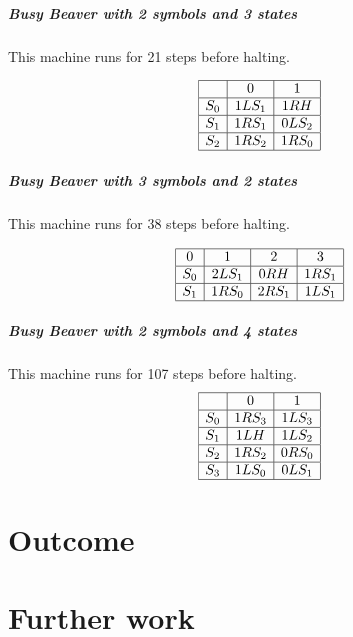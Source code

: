 \documentclass{report}
\begin{document}
\paragraph{Busy Beaver with 2 symbols and 3 states}

This machine runs for 21 steps before halting.

\[
\begin{array}[h]{|c|c|c|c|}
\hline
   & 0    &1\\
\hline
S_0& 1LS_1& 1RH\\
\hline
S_1& 1RS_1& 0LS_2\\
\hline
S_2& 1RS_2& 1RS_0\\
\hline
\end{array}
\]

\paragraph{Busy Beaver with 3 symbols and 2 states}

This machine runs for 38 steps before halting.

\[
\begin{array}[h]{|c|c|c|c|c|}
\hline
0&   1&   2& 3\\
\hline
S_0& 2LS_1& 0RH& 1RS_1\\
\hline
S_1& 1RS_0& 2RS_1& 1LS_1\\
\hline
\end{array}
\]

\paragraph{Busy Beaver with 2 symbols and 4 states}

This machine runs for 107 steps before halting.
\[
\begin{array}[h]{|c|c|c|c|}
  \hline
  &0&   1\\
  \hline
  S_0& 1RS_3& 1LS_3\\
  \hline
  S_1& 1LH& 1LS_2\\
  \hline
  S_2& 1RS_2& 0RS_0\\
  \hline
  S_3& 1LS_0& 0LS_1\\
\hline
\end{array}
\]

\chapter{Outcome}
\label{chap:outcome}


\chapter{Further work}
\label{chap:fwork}
\end{document}
